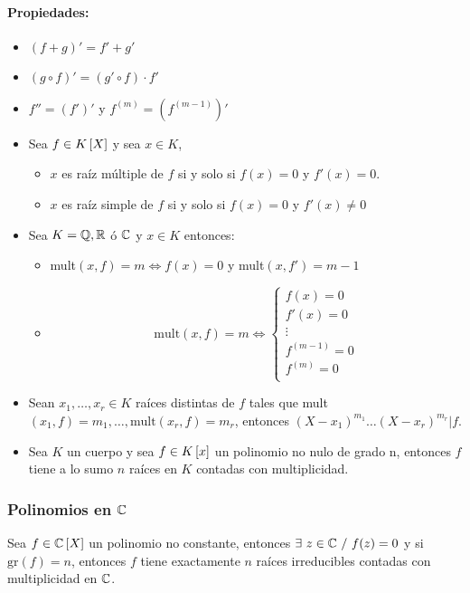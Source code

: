 \paragraph{Propiedades:}
\begin{itemize}
    \item $(f+g)' = f' + g'$
    \item $(g\circ f)' = (g'\circ f)\cdot f'$
    \item $f'' = (f')'$ y $f^{(m)} = (f^{(m-1)})'$
    \item Sea $f\in K\left[X\right]$ y sea $x\in K$,
    \begin{itemize}
        \item $x$ es raíz múltiple de $f$ si y solo si $f(x) = 0$ y $f'(x) = 0$.
        \item $x$ es raíz simple de $f$ si y solo si $f(x)=0$ y $f'(x)\neq 0$
    \end{itemize}
    \item Sea $K=\mathbb{Q},\mathbb{R}$ ó $\mathbb{C}$ y $x\in K$ entonces:
    \begin{itemize}
        \item mult$(x,f) = m \iff f(x)=0$ y mult$(x,f') = m-1$
        \item \begin{equation*}
             \text{mult}(x,f) = m \iff\left\{
                \begin{array}{c}
                    f(x) = 0 \\
                    f'(x) = 0 \\
                    \vdots \\
                    f^{(m-1)} = 0 \\
                    f^{(m)} = 0 \\
                \end{array}
             \right.
        \end{equation*}
    \end{itemize}
    
    \item Sean $x_1,\dots,x_r\in K$ raíces distintas de $f$ tales que mult$(x_1,f)=m_1,\dots,\text{mult}(x_r,f)=m_r$, entonces $(X-x_1)^{m_1}\dots(X-x_r)^{m_r}|f$.
    \item Sea $K$ un cuerpo y sea $f\in K\left[x\right]$ un polinomio no nulo de grado n, entonces $f$ tiene a lo sumo $n$ raíces en $K$ contadas con multiplicidad.
\end{itemize}

\subsubsection{Polinomios en \texorpdfstring{$\mathbb{C}$}{complejos}}
Sea $f\in\mathbb{C}\left[X\right]$ un polinomio no constante, entonces $\exists~z\in\mathbb{C}~/~f(z)=0$ y si $\text{gr}(f) = n$, entonces $f$ tiene exactamente $n$ raíces irreducibles contadas con multiplicidad en $\mathbb{C}$.

